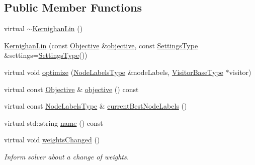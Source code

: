 \subsection*{Public Member Functions}
\begin{DoxyCompactItemize}
\item 
virtual \hyperlink{classnifty_1_1graph_1_1optimization_1_1multicut_1_1KernighanLin_a7454bf26658b182e5b35cc4d0bca6e1d}{$\sim$\+Kernighan\+Lin} ()
\item 
\hyperlink{classnifty_1_1graph_1_1optimization_1_1multicut_1_1KernighanLin_a00a1144833887f9873f437cee0cc46f3}{Kernighan\+Lin} (const \hyperlink{classnifty_1_1graph_1_1optimization_1_1multicut_1_1KernighanLin_abf00a316ed89c91b44806040d63757fd}{Objective} \&\hyperlink{classnifty_1_1graph_1_1optimization_1_1multicut_1_1KernighanLin_a0e95867e88bf83f79801a488229051ca}{objective}, const \hyperlink{structnifty_1_1graph_1_1optimization_1_1multicut_1_1KernighanLin_1_1SettingsType}{Settings\+Type} \&settings=\hyperlink{structnifty_1_1graph_1_1optimization_1_1multicut_1_1KernighanLin_1_1SettingsType}{Settings\+Type}())
\item 
virtual void \hyperlink{classnifty_1_1graph_1_1optimization_1_1multicut_1_1KernighanLin_ae80dbdb84f5691feb0ae18f27cf25263}{optimize} (\hyperlink{classnifty_1_1graph_1_1optimization_1_1multicut_1_1KernighanLin_a40cce2b5f9facb3e70c3bc6c6616ba6e}{Node\+Labels\+Type} \&node\+Labels, \hyperlink{classnifty_1_1graph_1_1optimization_1_1multicut_1_1KernighanLin_af81a8d0ada4683cfb667a2ed2b47a2c1}{Visitor\+Base\+Type} $\ast$visitor)
\item 
virtual const \hyperlink{classnifty_1_1graph_1_1optimization_1_1multicut_1_1KernighanLin_abf00a316ed89c91b44806040d63757fd}{Objective} \& \hyperlink{classnifty_1_1graph_1_1optimization_1_1multicut_1_1KernighanLin_a0e95867e88bf83f79801a488229051ca}{objective} () const 
\item 
virtual const \hyperlink{classnifty_1_1graph_1_1optimization_1_1multicut_1_1KernighanLin_a40cce2b5f9facb3e70c3bc6c6616ba6e}{Node\+Labels\+Type} \& \hyperlink{classnifty_1_1graph_1_1optimization_1_1multicut_1_1KernighanLin_ac2970f65a52da1fbfd0ecdd905efa8c5}{current\+Best\+Node\+Labels} ()
\item 
virtual std\+::string \hyperlink{classnifty_1_1graph_1_1optimization_1_1multicut_1_1KernighanLin_adc35484926c8a62679ce6b1a7f0c17d6}{name} () const 
\item 
virtual void \hyperlink{classnifty_1_1graph_1_1optimization_1_1multicut_1_1KernighanLin_a4766290e8d3ef44b73a97357367624f4}{weights\+Changed} ()
\begin{DoxyCompactList}\small\item\em Inform solver about a change of weights. \end{DoxyCompactList}\end{DoxyCompactItemize}


